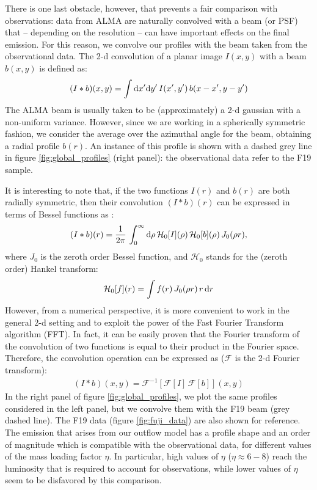 There is one last obstacle, however, that prevents a fair comparison with observations: data from ALMA are naturally convolved with a beam (or PSF) that -- depending on the resolution -- can have important effects on the final \CII emission. For this reason, we convolve our profiles with the beam taken from the observational data. The 2-d convolution of a planar image $I(x,y)$ with a beam $b(x,y)$ is defined as: 
\begin{align}
    (I*b)(x,y)= \int \mathrm{d} x' \mathrm{d} y' \, I(x',y')\,b(x-x',y-y')
\end{align}
The ALMA beam is usually taken to be (approximately) a 2-d gaussian with a non-uniform variance. However, since we are working in a spherically symmetric fashion, we consider the average over the azimuthal angle for the beam, obtaining a radial profile $b(r)$. An instance of this profile is shown with a dashed grey line in figure \ref{fig:global_profiles} (right panel): the observational data refer to the F19 sample. 

It is interesting to note that, if the two functions $I(r)$ and $b(r)$ are both radially symmetric, then their convolution $(I*b)(r)$ can be expressed in terms of Bessel functions as \citep[see e.g.,][]{Baddour:09}:
\begin{align}
    (I*b)(r)= \frac{1}{2\pi}\,\int_0^\infty \mathrm{d} \rho \, \mathcal{H}_0[I](\rho)\, \mathcal{H}_0[b](\rho) \, J_0(\rho r),
\end{align}
where $J_0$ is the zeroth order Bessel function, and $\mathcal{H}_0$ stands for the (zeroth order) Hankel transform:
\begin{align}
    \mathcal{H}_0[f](r) = \int f(r)\,J_0(\rho r)\,r\,\mathrm{d} r
\end{align}
However, from a numerical perspective, it is more convenient to work in the general 2-d setting and to exploit the power of the Fast Fourier Transform algorithm (FFT). In fact, it can be easily proven that the Fourier transform of the convolution of two functions is equal to their product in the Fourier space. Therefore, the convolution operation can be expressed as ($\mathcal{F}$ is the 2-d Fourier transform):
\begin{align}
    (I*b)(x,y) = \mathcal{F}^{-1}\left[\mathcal{F}[I]\,\mathcal{F}[b]\right](x,y)
\end{align}
In the right panel of figure \ref{fig:global_profiles}, we plot the same profiles considered in the left panel, but we convolve them with the F19 beam (grey dashed line). The F19 data (figure \ref{fig:fuji_data}) are also shown for reference. The \CII emission that arises from our outflow model has a profile shape and an order of magnitude which is compatible with the observational data, for different values of the mass loading factor $\eta$. In particular, high values of $\eta$ ($\eta\approx 6-8$) reach the \CII luminosity that is required to account for observations, while lower values of $\eta$ seem to be disfavored by this comparison. 


